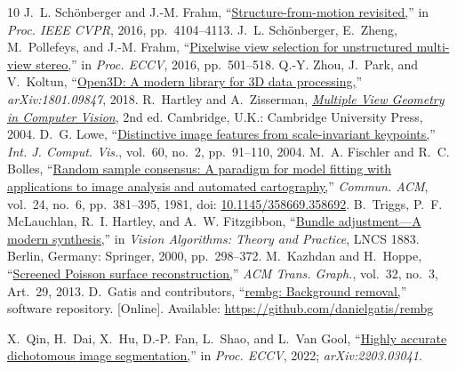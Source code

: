 \documentclass[conference]{IEEEtran}
\begin{document}
\begin{thebibliography}{10}
 J.~L. Sch\"onberger and J.-M. Frahm, ``\href{https://openaccess.thecvf.com/content_cvpr_2016/papers/Schonberger_Structure-From-Motion_Revisited_CVPR_2016_paper.pdf}{Structure-from-motion revisited,}'' in \emph{Proc. IEEE CVPR}, 2016, pp.~4104--4113.
 J.~L. Sch\"onberger, E.~Zheng, M.~Pollefeys, and J.-M. Frahm, ``\href{https://demuc.de/papers/schoenberger2016mvs.pdf}{Pixelwise view selection for unstructured multi-view stereo,}'' in \emph{Proc. ECCV}, 2016, pp.~501--518.
 Q.-Y. Zhou, J.~Park, and V.~Koltun, ``\href{https://arxiv.org/abs/1801.09847}{Open3D: A modern library for 3D data processing,}'' \emph{arXiv:1801.09847}, 2018.
 R.~Hartley and A.~Zisserman, \href{https://www.robots.ox.ac.uk/~vgg/hzbook/}{\emph{Multiple View Geometry in Computer Vision}}, 2nd ed. Cambridge, U.K.: Cambridge University Press, 2004.
 D.~G. Lowe, ``\href{https://doi.org/10.1023/B:VISI.0000029664.99615.94}{Distinctive image features from scale-invariant keypoints,}'' \emph{Int. J. Comput. Vis.}, vol.~60, no.~2, pp.~91--110, 2004.
 M.~A. Fischler and R.~C. Bolles, ``\href{https://doi.org/10.1145/358669.358692}{Random sample consensus: A paradigm for model fitting with applications to image analysis and automated cartography,}'' \emph{Commun. ACM}, vol.~24, no.~6, pp.~381--395, 1981, doi: \href{https://doi.org/10.1145/358669.358692}{10.1145/358669.358692}.
 B.~Triggs, P.~F. McLauchlan, R.~I. Hartley, and A.~W. Fitzgibbon, ``\href{https://doi.org/10.1007/3-540-44480-7_21}{Bundle adjustment---A modern synthesis,}'' in \emph{Vision Algorithms: Theory and Practice}, LNCS 1883. Berlin, Germany: Springer, 2000, pp.~298--372.
 M.~Kazhdan and H.~Hoppe, ``\href{https://www.hhoppe.com/screenedpoisson.pdf}{Screened Poisson surface reconstruction,}'' \emph{ACM Trans. Graph.}, vol.~32, no.~3, Art.~29, 2013.
 D.~Gatis and contributors, ``\href{https://github.com/danielgatis/rembg}{rembg: Background removal,}'' software repository. [Online]. Available: \url{https://github.com/danielgatis/rembg}

 X.~Qin, H.~Dai, X.~Hu, D.-P. Fan, L.~Shao, and L.~Van Gool, ``\href{https://arxiv.org/abs/2203.03041}{Highly accurate dichotomous image segmentation,}'' in \emph{Proc. ECCV}, 2022; \emph{arXiv:2203.03041}.
\end{thebibliography}
\end{document}
